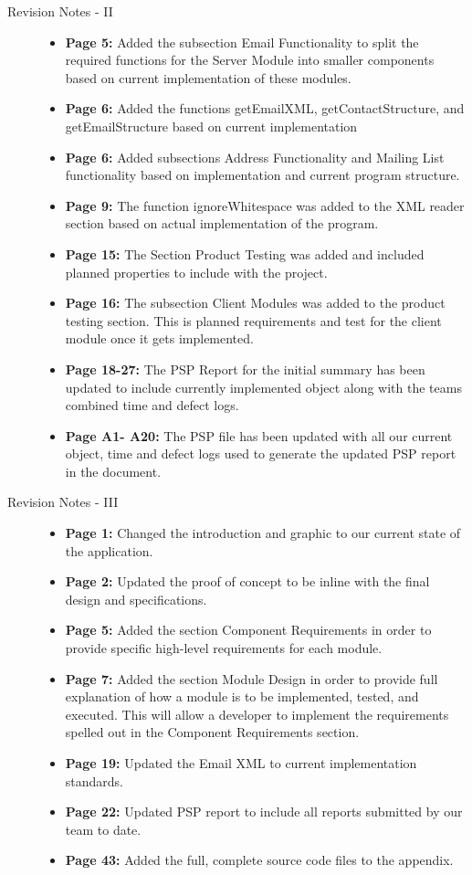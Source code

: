 \documentclass[11pt, letterpaper]{report}
\begin{document}
\begin{description}
\item[\Large Revision Notes - II] \hfill
\begin{itemize}
\item \textbf{Page 5:} Added the subsection Email Functionality to split the required functions for the Server Module into smaller components based on current implementation of these modules. 
\item \textbf{Page 6:} Added the functions getEmailXML, getContactStructure, and getEmailStructure based on current implementation
\item \textbf{Page 6:} Added subsections Address Functionality and Mailing List functionality based on implementation and current program structure. 
\item\textbf{Page 9:} The function ignoreWhitespace was added to the XML reader section based on actual implementation of the program.
\item \textbf{Page 15:} The Section Product Testing was added and included planned properties to include with the project.
\item \textbf{Page 16:} The subsection Client Modules was added to the product testing section. This is planned requirements and test for the client module once it gets implemented.
\item \textbf{Page 18-27:} The PSP Report for the initial summary has been updated to include currently implemented object along with the teams combined time and defect logs.
\item \textbf{Page A1- A20:} The PSP file has been updated with all our current object, time and defect logs used to generate the updated PSP report in the document.
\end{itemize}
\newpage
\item[\Large Revision Notes - III] \hfill
\begin{itemize}
\item \textbf{Page 1:} Changed the introduction and graphic  to our current state of the application.
\item \textbf{Page 2:} Updated the proof of concept to be inline with the final design and specifications.
\item \textbf{Page 5:} Added the section Component Requirements in order to provide specific high-level requirements for each module.
\item \textbf{Page 7:} Added the section Module Design in order to provide full explanation of how a module is to be implemented, tested, and executed. This will allow a developer to implement the requirements spelled out in the Component Requirements section.
\item \textbf{Page 19:} Updated the Email XML to current implementation standards.
\item \textbf{Page 22:} Updated PSP report to include all reports submitted by our team to date.
\item \textbf{Page 43:} Added the full, complete source code files to the appendix.
\end{itemize}


\end{description}
\end{document}
